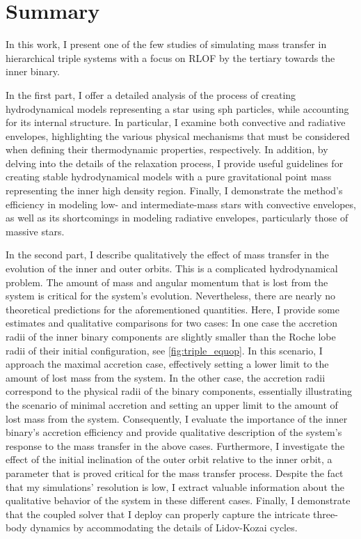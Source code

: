 \section{Summary}

In this work, I present one of the few studies of simulating mass transfer in hierarchical triple systems with a focus on RLOF by the tertiary towards the inner binary. 

In the first part, I offer a detailed analysis of the process of creating hydrodynamical models representing a star using \ac{sph} particles, while accounting for its internal structure. In particular, I examine both convective and radiative envelopes, highlighting the various physical mechanisms that must be considered when defining their thermodynamic properties, respectively. In addition, by delving into the details of the relaxation process, I provide useful guidelines for creating stable hydrodynamical models with a
pure gravitational point mass representing the inner high density region. Finally, I demonstrate the method's efficiency in modeling low- and intermediate-mass stars with convective envelopes, as well as its shortcomings in modeling radiative envelopes, particularly those of massive stars.

In the second part, I describe qualitatively the effect of mass transfer in the evolution of the inner and outer orbits. This is a complicated hydrodynamical problem. The amount of mass and angular momentum that is lost from the system is critical for the system's evolution. Nevertheless, there are nearly no theoretical predictions for the aforementioned quantities. Here, I provide some estimates and qualitative comparisons for two cases: In one case the accretion radii of the inner binary components are slightly smaller than the Roche lobe radii of their initial configuration, see \cref{fig:triple_equop}. In this scenario, I approach the maximal accretion case, effectively setting a lower limit to the amount of lost mass from the system. In the other case, the accretion radii correspond to the physical radii of the binary components, essentially illustrating the scenario of minimal accretion and setting an upper limit to the amount of lost mass from the system. Consequently, I evaluate the importance of the inner binary's accretion efficiency and provide qualitative description of the system's response to the mass transfer in the above cases. Furthermore, I investigate the effect of the initial inclination of the outer orbit relative to the inner orbit, a parameter that is proved  critical for the mass transfer process. Despite the fact that my simulations' resolution is low, I extract valuable information about the qualitative behavior of the system in these different cases. Finally, I demonstrate that the coupled solver that I deploy can properly capture the intricate three-body dynamics by accommodating the details of Lidov-Kozai cycles. 

